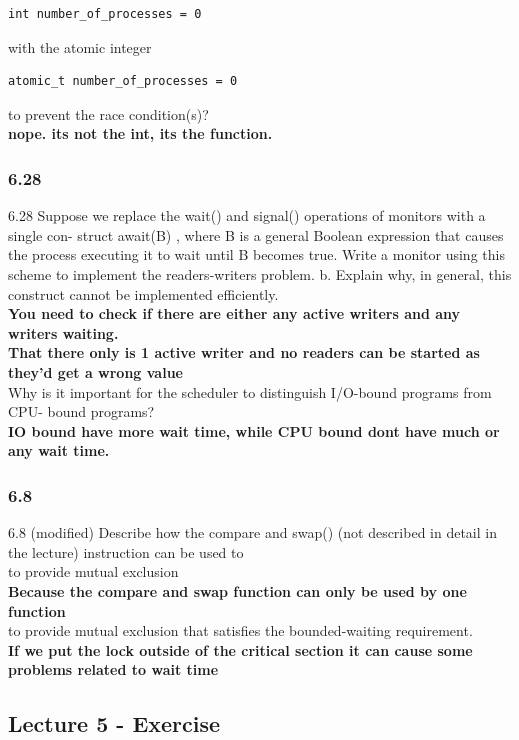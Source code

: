 \documentclass[a4paper,10pt,titlepage]{report}
\begin{document}
\begin{lstlisting}[frame=single]
int number_of_processes = 0
\end{lstlisting}
with the atomic integer
\begin{lstlisting}[frame=single]
atomic_t number_of_processes = 0
\end{lstlisting}
to prevent the race condition(s)? \\
\textbf{nope. its not the int, its the function.}

\subsubsection{6.28}
6.28 Suppose we replace the wait() and signal() operations of monitors with a single con- struct await(B) , where B is a general Boolean expression that causes the process executing it to wait until B becomes true.
Write a monitor using this scheme to implement the readers-writers problem. b. Explain why, in general, this construct cannot be implemented efficiently.\\
\textbf{You need to check if there are either any active writers and any writers waiting.} \\
\textbf{That there only is 1 active writer and no readers can be started as they'd get a wrong value} \\

Why is it important for the scheduler to distinguish I/O-bound programs from CPU- bound programs?\\
\textbf{IO bound have more wait time, while CPU bound dont have much or any wait time.}
\subsubsection{6.8}
6.8 (modified) Describe how the compare and swap() (not described in detail in the lecture) instruction can be used to \\

to provide mutual exclusion \\
\textbf{Because the compare and swap function can only be used by one function} \\
to provide mutual exclusion that satisfies the bounded-waiting requirement. \\
\textbf{If we put the lock outside of the critical section it can cause some problems related to wait time}



\newpage
\subsection{Lecture 5 - Exercise}
\end{document}
